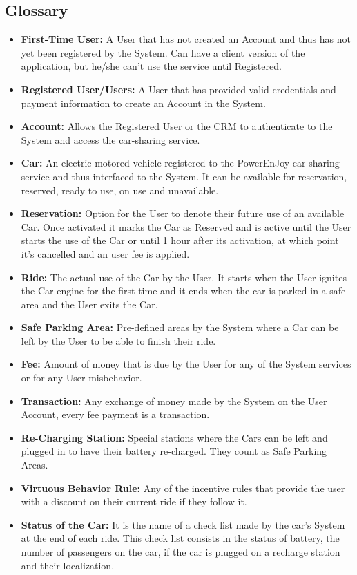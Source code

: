 \documentclass[a4paper]{article}
\begin{document}
\subsection{Glossary}
\begin{itemize}
\item \textbf{First-Time User:} A User that has not created an Account and thus has not yet been registered by the System. Can have a client version of the application, but he/she can't use the service until Registered.
\item \textbf{Registered User/Users:} A User that has provided valid credentials and payment information to create an Account in the System.
\item \textbf{Account:} Allows the Registered User or the CRM to authenticate to the System and access the car-sharing service.
\item \textbf{Car:} An electric motored vehicle registered to the PowerEnJoy car-sharing service and thus interfaced to the System. It can be available for reservation, reserved, ready to use, on use and unavailable.
\item \textbf{Reservation:} Option for the User to denote their future use of an available Car. Once activated it marks the Car as Reserved and is active until the User starts the use of the Car or until 1 hour after its activation, at which point it's cancelled and an user fee is applied.
\item \textbf{Ride:} The actual use of the Car by the User. It starts when the User ignites the Car engine for the first time and it ends when the car is parked in a safe area and the User exits the Car.
\item \textbf{Safe Parking Area:} Pre-defined areas by the System where a Car can be left by the User to be able to finish their ride.
\item \textbf{Fee:} Amount of money that is due by the User for any of the System services or for any User misbehavior.
\item \textbf{Transaction:} Any exchange of money made by the System on the User Account, every fee payment is a transaction.
\item \textbf{Re-Charging Station:} Special stations where the Cars can be left and plugged in to have their battery re-charged. They count as Safe Parking Areas.
\item \textbf{Virtuous Behavior Rule:} Any of the incentive rules that provide the user with a discount on their current ride if they follow it.
\item \textbf{Status of the Car:} It is the name of a check list made by the car's System at the end of each ride. This check list consists in the status of battery, the number of passengers on the car, if the car is plugged on a recharge station and their localization.

\end{itemize}
\end{document}
